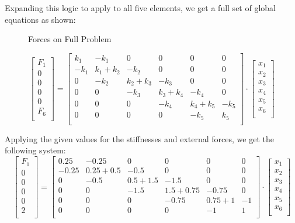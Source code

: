 \documentclass[8pt]{article}
\begin{document}
Expanding this logic to apply to all five elements, we get a full set of global equations as shown:
\begin{figure}[h!]
    \centering
    \caption{Forces on Full Problem}
\end{figure}
\[
\begin{bmatrix}
    F_1 \\
    0 \\
    0 \\
    0 \\
    0 \\
    F_6 \\
\end{bmatrix}
=
\begin{bmatrix}
    k_1 & -k_1 & 0 & 0 & 0 & 0 \\
    -k_1 & k_1 + k_2 & -k_2 & 0 & 0 & 0 \\
    0 & -k_2 & k_2 + k_3 & -k_3 & 0 & 0 \\
    0 & 0 & -k_3 & k_3 + k_4 & -k_4 & 0 \\
    0 & 0 & 0 & -k_4 & k_4 + k_5 & -k_5 \\
    0 & 0 & 0 & 0 & -k_5 & k_5 \\
\end{bmatrix}
\cdot
\begin{bmatrix}
    x_1 \\
    x_2 \\
    x_3 \\
    x_4 \\
    x_5 \\
    x_6 \\
\end{bmatrix}
\]

Applying the given values for the stiffnesses and external forces, we get the following system:
\[
\begin{bmatrix}
    F_1 \\
    0 \\
    0 \\
    0 \\
    0 \\
    2 \\
\end{bmatrix}
=
\begin{bmatrix}
    0.25 & -0.25 & 0 & 0 & 0 & 0 \\
    -0.25 & 0.25 + 0.5 & -0.5 & 0 & 0 & 0 \\
    0 & -0.5 & 0.5 + 1.5 & -1.5 & 0 & 0 \\
    0 & 0 & -1.5 & 1.5 + 0.75 & -0.75 & 0 \\
    0 & 0 & 0 & -0.75 & 0.75 + 1 & -1 \\
    0 & 0 & 0 & 0 & -1 & 1 \\
\end{bmatrix}
\cdot
\begin{bmatrix}
    x_1 \\
    x_2 \\
    x_3 \\
    x_4 \\
    x_5 \\
    x_6 \\
\end{bmatrix}
\]
\end{document}
